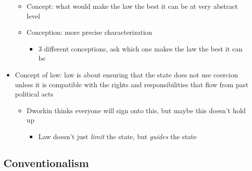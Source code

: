 \begin{itemize}
  \begin{itemize}
  \tightlist
  \item
    Concept: what would make the law the best it can be at very abstract
    level
  \item
    Conception: more precise characterization

    \begin{itemize}
    \tightlist
    \item
      3 different conceptions, ask which one makes the law the best it
      can be
    \end{itemize}
  \end{itemize}
\item
  Concept of law: law is about ensuring that the state does not use
  coercion unless it is compatible with the rights and responsibilities
  that flow from past political acts

  \begin{itemize}
  \tightlist
  \item
    Dworkin thinks everyone will sign onto this, but maybe this doesn't
    hold up

    \begin{itemize}
    \tightlist
    \item
      Law doesn't just \emph{limit} the state, but \emph{guides} the
      state
    \end{itemize}
  \end{itemize}
\end{itemize}

\hypertarget{conventionalism}{%
\subsection{Conventionalism}\label{conventionalism}}

